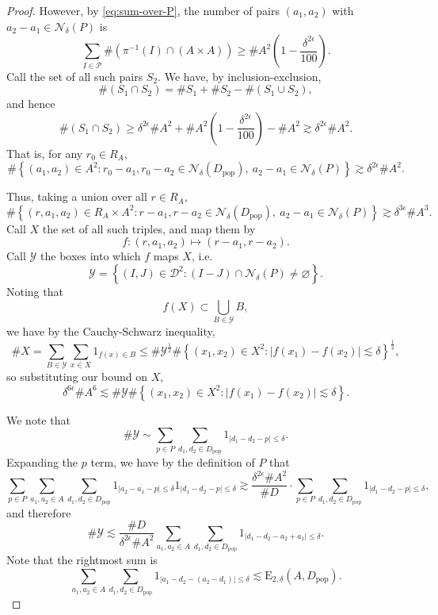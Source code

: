 \documentclass[12pt]{amsart}
\newcommand{\cD}{\mathcal{D}}
\newcommand{\pop}{D_{\mathrm{pop}}}
\newcommand{\1}{\mathbf{1}}
\newcommand{\cY}{\mathcal{Y}}
\begin{document}
\begin{proof}
However, by \eqref{eq:sum-over-P}, the number of pairs \((a_1,a_2)\) with \(a_2 - a_1 \in \mathcal{N} _{\delta} (P) \) is 
\[
	\sum _{I \in \mathcal{P} } \# \left( \pi ^{-1} (I) \cap \left( A \times A \right)  \right) \geq   \# A ^{2} \left( 1 - \frac{\delta ^{2 \epsilon}}{100}  \right) 
.\]
Call the set of all such pairs \(S_2\).
We have, by inclusion-exclusion,
\[
	 \#(S_1 \cap S_2)= \#S_1  + \#S_2 -  \#(S_1 \cup S_2 )
,\]
and hence
\[
	\#(S_1 \cap S_2)  \geq \delta^{2 \epsilon}\# A ^{2} + \# A ^{2} \left( 1 - \frac{\delta ^{2 \epsilon}}{100}  \right)  - \# A ^{2} \gtrsim \delta^{2 \epsilon}\# A ^{2}
.\]
That is, for any \(r_0 \in R_{A} \),
\[
	\# \left\{ (a_1,a_2)\in A ^{2} : r_0 - a_1, r_0-a_2 \in \mathcal{N} _{\delta} (D_{\text{pop}} ) ,~ a_2 - a_1 \in \mathcal{N} _{\delta} (P) \right\} \gtrsim \delta^{2 \epsilon}\# A ^{2}
.\]

Thus, taking a union over all \(r \in R_{A} \),
\[
	\# \left\{ (r,a_1,a_2)\in R_{A} \times A^{2} : r - a_1, r-a_2 \in \mathcal{N} _{\delta} (D_{\text{pop}} ) ,~ a_2 - a_1 \in \mathcal{N} _{\delta} (P)  \right\} \gtrsim \delta ^{3 \epsilon} \# A ^{3} 
.\]
Call \(X\) the set of all such triples, and map them by
\[
	f : (r,a_1,a_2)\mapsto (r - a_1, r-a_2)
.\]
Call \(\mathcal{Y} \) the boxes into which \(f\) maps \(X\), i.e.
\[
	\cY = \left\{ (I,J) \in  \cD^2  : \left( I - J \right) \cap \mathcal{N} _{\delta} (P) \neq \varnothing  \right\} 
.\]
Noting that
\[
	f(X) \subset \bigcup _{ B\in \mathcal{Y} } B
,\]
we have by the Cauchy-Schwarz inequality,
\[
	\# X  = \sum _{B \in \mathcal{Y} } \sum _{x \in X} 1_{f(x) \in B}  \leq \# \mathcal{Y} ^{\frac{1}{2} } \# \left\{ (x_1,x_2)\in X^{2} : \left\lvert f(x_1 ) - f(x_2) \right\rvert \lesssim \delta \right\} ^{\frac{1}{2} }
,\]
so substituting our bound on \(X\),
\begin{equation} \label{eq:to-substitute}
	\delta ^{6 \epsilon} \# A ^{6}\lesssim \#\cY \# \left\{ (x_1,x_2)\in X^{2} : |f(x_1) - f(x_2)| \lesssim \delta \right\} .
\end{equation}	

We note that
\[
	\# \cY \sim \sum _{p \in P} \sum _{d_1,d_2 \in \pop }1_{\left\lvert d_1 - d_2 - p \right\rvert \leq \delta} 
.\]
Expanding the \(p\) term, we have by the definition of \(P\) that
\[
	\sum _{p \in P} \sum _{a_1,a_2 \in A} \sum _{d_1,d_2 \in D _{ \text{pop} } } 1_{\left\lvert a_2 - a_1 - p \right\rvert \leq \delta} 1_{\left\lvert d_1 - d_2 - p \right\rvert \leq \delta	} \gtrsim \frac{\delta ^{2 \epsilon}\# A ^{2}}{\# D} \cdot \sum _{p \in P} \sum _{d_1,d_2 \in \pop } 1_{\left\lvert d_1 - d_2 - p \right\rvert \leq \delta	}
,\]
and therefore
\[
	\# \cY \lesssim \frac{\# D}{\delta^{2 \epsilon}\# A^{2}} \sum _{a_1,a_2 \in A} \sum _{d_1,d_2 \in \pop }1_{\left\lvert d_1 - d_2 -a_2 + a_1 \right\rvert \leq \delta} 
.\]
Note that the rightmost sum is
\[
	\sum _{a_1,a_2 \in A} \sum _{d_1,d_2 \in D_{\text{pop}} } 1_{\left\lvert a_1-d_2 - (a_2 - d_1) \right\rvert \leq \delta} \lesssim \mathrm{E} _{2,\delta} (A,D_{\text{pop}} 	)
.\]



\end{proof}
\end{document}
